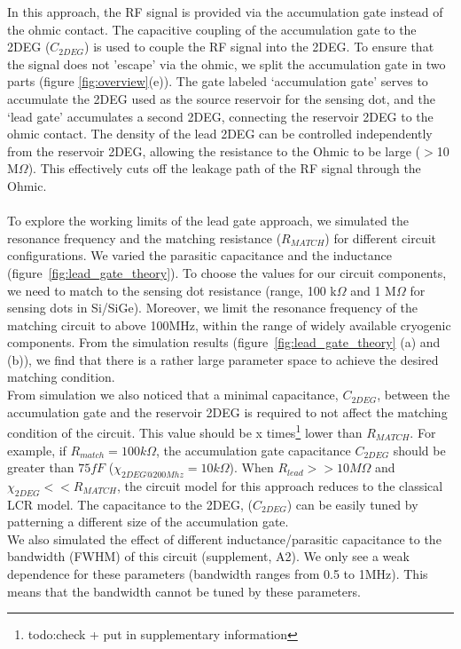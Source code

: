 \documentclass{article}
\begin{document}
In this approach, the RF signal is provided via the accumulation gate\cite{Volk2019} instead of the ohmic contact. The capacitive coupling of the accumulation gate to the 2DEG ($C_{2DEG}$) is used to couple the RF signal into the 2DEG. To ensure that the signal does not 'escape' via the ohmic, we  split the accumulation gate in two parts (figure \ref{fig:overview}(e)).
The gate labeled ‘accumulation gate’ serves to accumulate the 2DEG used as the source reservoir for the sensing dot, and the ‘lead gate’ accumulates a second 2DEG, connecting the reservoir 2DEG to the ohmic contact. The density of the lead 2DEG can be controlled independently from the reservoir 2DEG, allowing the resistance to the Ohmic to be large ($>$10 M$\Omega$). This effectively cuts off the leakage path of the RF signal through the Ohmic.
\\ \\
To explore the working limits of the lead gate approach, we simulated the resonance frequency and the matching resistance ($R_{MATCH}$) for different circuit configurations. We varied the parasitic capacitance and the inductance (figure\ \ref{fig:lead_gate_theory}). To choose the values for our circuit components, we need to match to the sensing dot resistance (range, 100 k$\Omega$ and 1 M$\Omega$ for sensing dots in Si/SiGe). Moreover, we limit the resonance frequency of the matching circuit to above 100MHz, within the range of widely available cryogenic components. From the simulation results (figure\ \ref{fig:lead_gate_theory} (a) and (b)), we find that there is a rather large parameter space to achieve the desired matching condition.
\\
From simulation we also noticed that a minimal capacitance, $C_{2DEG}$, between the accumulation gate and the reservoir 2DEG is required to not affect the matching condition of the circuit. This value should be x times\footnote{todo:check + put in supplementary information} lower than $R_{MATCH}$. For example, if $R_{match}=100k\Omega$, the accumulation gate capacitance $C_{2DEG}$ should be greater than $75fF$ ($\chi_{2DEG@200 Mhz} = 10k\Omega$). When $R_{lead} >> 10M\Omega$ and $\chi_{2DEG} << R_{MATCH}$, the circuit model for this approach reduces to the classical LCR model. The capacitance to the 2DEG, ($C_{2DEG}$) can be easily tuned by patterning a different size of the accumulation gate.
\\
We also simulated the effect of different inductance/parasitic capacitance to the bandwidth (FWHM) of this circuit (supplement, A2). We only see a weak dependence for these parameters (bandwidth ranges from 0.5 to 1MHz). This means that the bandwidth cannot be tuned by these parameters.
\end{document}
